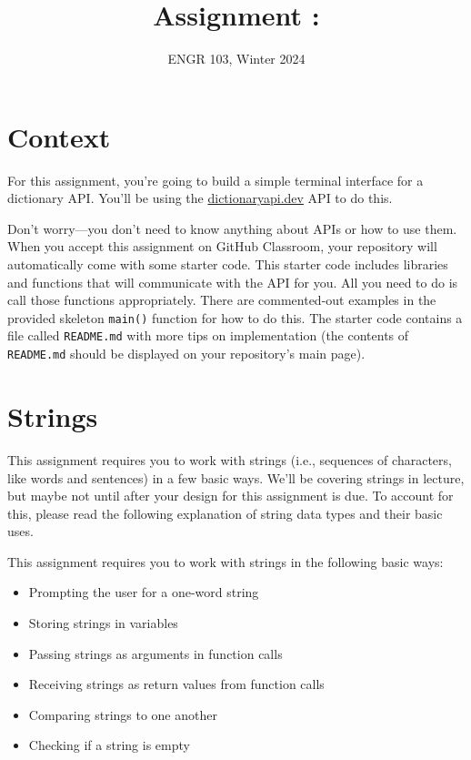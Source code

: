 \documentclass{article}
\title{
    Assignment \assignmentnumber: \assignmenttitle
}
\author{ENGR 103, Winter 2024}
\date{}
\begin{document}
\maketitle

\section{Context}

For this assignment, you're going to build a simple terminal interface for a dictionary API. You'll be using the \href{https://dictionaryapi.dev/}{dictionaryapi.dev} API to do this.

Don't worry---you don't need to know anything about APIs or how to use them. When you accept this assignment on GitHub Classroom, your repository will automatically come with some starter code. This starter code includes libraries and functions that will communicate with the API for you. All you need to do is call those functions appropriately. There are commented-out examples in the provided skeleton \texttt{main()} function for how to do this. The starter code contains a file called \texttt{README.md} with more tips on implementation (the contents of \texttt{README.md} should be displayed on your repository's main page).

\section{Strings}

This assignment requires you to work with strings (i.e., sequences of characters, like words and sentences) in a few basic ways. We'll be covering strings in lecture, but maybe not until after your design for this assignment is due. To account for this, please read the following explanation of string data types and their basic uses.

This assignment requires you to work with strings in the following basic ways:

\begin{itemize}
    \item Prompting the user for a one-word string
    \item Storing strings in variables
    \item Passing strings as arguments in function calls
    \item Receiving strings as return values from function calls
    \item Comparing strings to one another
    \item Checking if a string is empty
\end{itemize}
\end{document}
